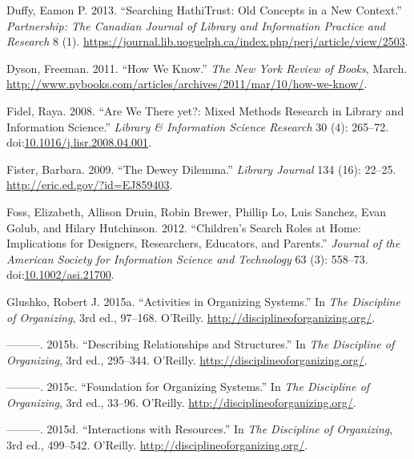 \documentclass[]{article}
\begin{document}
\hypertarget{ref-duffyux5fsearchingux5f2013}{}
Duffy, Eamon P. 2013. ``Searching HathiTrust: Old Concepts in a New
Context.'' \emph{Partnership: The Canadian Journal of Library and
Information Practice and Research} 8 (1).
\url{https://journal.lib.uoguelph.ca/index.php/perj/article/view/2503}.

\hypertarget{ref-dysonux5fhowux5f2011}{}
Dyson, Freeman. 2011. ``How We Know.'' \emph{The New York Review of
Books}, March.
\url{http://www.nybooks.com/articles/archives/2011/mar/10/how-we-know/}.

\hypertarget{ref-fidelux5fareux5f2008}{}
Fidel, Raya. 2008. ``Are We There yet?: Mixed Methods Research in
Library and Information Science.'' \emph{Library \& Information Science
Research} 30 (4): 265--72.
doi:\href{https://doi.org/10.1016/j.lisr.2008.04.001}{10.1016/j.lisr.2008.04.001}.

\hypertarget{ref-fisterux5fdeweyux5f2009}{}
Fister, Barbara. 2009. ``The Dewey Dilemma.'' \emph{Library Journal} 134
(16): 22--25. \url{http://eric.ed.gov/?id=EJ859403}.

\hypertarget{ref-fossux5fchildrensux5f2012}{}
Foss, Elizabeth, Allison Druin, Robin Brewer, Phillip Lo, Luis Sanchez,
Evan Golub, and Hilary Hutchinson. 2012. ``Children's Search Roles at
Home: Implications for Designers, Researchers, Educators, and Parents.''
\emph{Journal of the American Society for Information Science and
Technology} 63 (3): 558--73.
doi:\href{https://doi.org/10.1002/asi.21700}{10.1002/asi.21700}.

\hypertarget{ref-glushkoux5factivitiesux5f2015}{}
Glushko, Robert J. 2015a. ``Activities in Organizing Systems.'' In
\emph{The Discipline of Organizing}, 3rd ed., 97--168. O'Reilly.
\url{http://disciplineoforganizing.org/}.

\hypertarget{ref-glushkoux5fdescribingux5f2015}{}
---------. 2015b. ``Describing Relationships and Structures.'' In
\emph{The Discipline of Organizing}, 3rd ed., 295--344. O'Reilly.
\url{http://disciplineoforganizing.org/}.

\hypertarget{ref-glushkoux5ffoundationux5f2015}{}
---------. 2015c. ``Foundation for Organizing Systems.'' In \emph{The
Discipline of Organizing}, 3rd ed., 33--96. O'Reilly.
\url{http://disciplineoforganizing.org/}.

\hypertarget{ref-glushkoux5finteractionsux5f2015}{}
---------. 2015d. ``Interactions with Resources.'' In \emph{The
Discipline of Organizing}, 3rd ed., 499--542. O'Reilly.
\url{http://disciplineoforganizing.org/}.
\end{document}

